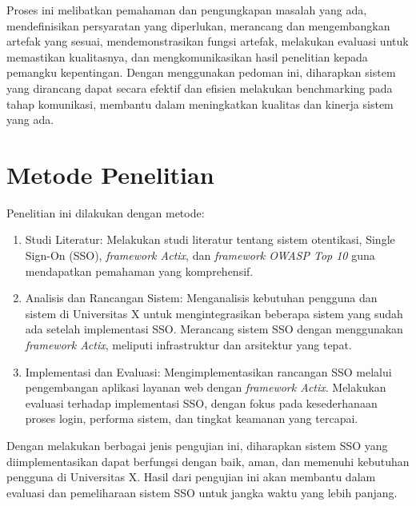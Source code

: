 \documentclass[12pt]{article}
\begin{document}
Proses ini melibatkan pemahaman dan pengungkapan masalah yang ada, mendefinisikan persyaratan yang diperlukan, merancang dan mengembangkan artefak yang sesuai, mendemonstrasikan fungsi artefak, melakukan evaluasi untuk memastikan kualitasnya, dan mengkomunikasikan hasil penelitian kepada pemangku kepentingan. Dengan menggunakan pedoman ini, diharapkan sistem yang dirancang dapat secara efektif dan efisien melakukan benchmarking pada tahap komunikasi, membantu dalam meningkatkan kualitas dan kinerja sistem yang ada\autocite{DesignScienceHevner2004}.

\section{Metode Penelitian}
Penelitian ini dilakukan dengan metode:

\begin{enumerate}
        
    \item Studi Literatur: Melakukan studi literatur tentang sistem otentikasi, Single Sign-On (SSO), \emph{framework Actix}, dan \emph{framework OWASP Top 10} guna mendapatkan pemahaman yang komprehensif.
    
    \item Analisis dan Rancangan Sistem: Menganalisis kebutuhan pengguna dan sistem di Universitas X untuk mengintegrasikan beberapa sistem yang sudah ada setelah implementasi SSO. Merancang sistem SSO dengan menggunakan \emph{framework Actix}, meliputi infrastruktur dan arsitektur yang tepat.
    
    \item Implementasi dan Evaluasi: Mengimplementasikan rancangan SSO melalui pengembangan aplikasi layanan web dengan \emph{framework Actix}. Melakukan evaluasi terhadap implementasi SSO, dengan fokus pada kesederhanaan proses login, performa sistem, dan tingkat keamanan yang tercapai.
    
\end{enumerate}

Dengan melakukan berbagai jenis pengujian ini, diharapkan sistem SSO yang diimplementasikan dapat berfungsi dengan baik, aman, dan memenuhi kebutuhan pengguna di Universitas X. Hasil dari pengujian ini akan membantu dalam evaluasi dan pemeliharaan sistem SSO untuk jangka waktu yang lebih panjang.
% 
% 
\printbibliography[title=Daftar Pustaka]
\newpage
\end{document}
